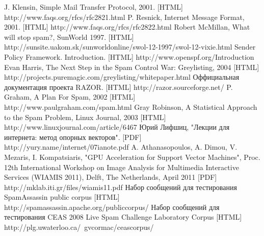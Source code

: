\newpage
\begin{thebibliography}{99}
 J. Klensin, Simple Mail Transfer Protocol, 2001. [HTML] http://www.faqs.org/rfcs/rfc2821.html 
 P. Resnick, Internet Message Format, 2001. [HTML] http://www.faqs.org/rfcs/rfc2822.html
 Robert McMillan, What will stop spam?, SunWorld 1997. [HTML] http://sunsite.uakom.sk/sunworldonline/swol-12-1997/swol-12-vixie.html
 Sender Policy Framework. Introduction.  [HTML] http://www.openspf.org/Introduction
 Evan Harris, The Next Step in the Spam Control War: Greylisting, 2004 [HTML] http://projects.puremagic.com/greylisting/whitepaper.html
 Оффициальная документация проекта RAZOR. [HTML] http://razor.sourceforge.net/
 P. Graham, A Plan For Spam, 2002 [HTML] http://www.paulgraham.com/spam.html
 Gray Robinson, A Statistical Approach to the Spam Problem, Linux Journal, 2003 [HTML] http://www.linuxjournal.com/article/6467 
 Юрий Лифшиц, "Лекции для интернета: метод опорных векторов". [PDF] http://yury.name/internet/07ianote.pdf
A. Athanasopoulos, A. Dimou, V. Mezaris, I. Kompatsiaris, "GPU Acceleration for Support Vector Machines", Proc. 12th International Workshop on Image Analysis for Multimedia Interactive Services (WIAMIS 2011), Delft, The Netherlands, April 2011 [PDF] http://mklab.iti.gr/files/wiamis11.pdf
 Набор сообщений для тестирования SpamAssassin public corpus [HTML] http://spamassassin.apache.org/publiccorpus/
 Набор сообщений для тестирования CEAS 2008 Live Spam Challenge Laboratory Corpus [HTML] http://plg.uwaterloo.ca/~gvcormac/ceascorpus/
\end{thebibliography}
